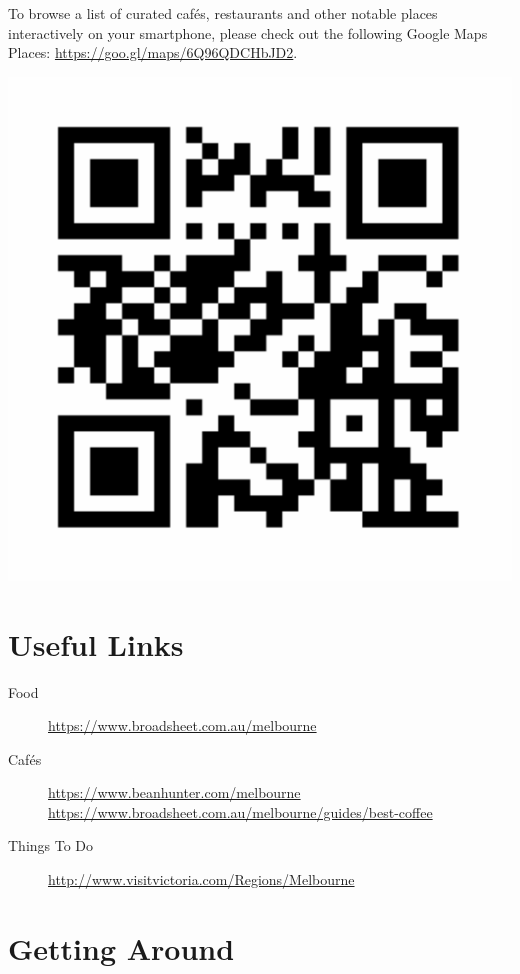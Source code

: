 To browse a list of curated caf{\'e}s, restaurants and other notable places interactively on your smartphone, please check out the following Google Maps Places: \url{https://goo.gl/maps/6Q96QDCHbJD2}.
\vspace*{-1.3em}
\begin{center}
\includegraphics[scale=0.2]{content/local-guide/gmaps.pdf}
\end{center}

\section*{Useful Links}
\vspace*{-1em}

\begin{description}
\item[Food] \url{https://www.broadsheet.com.au/melbourne}
\item[Caf{\'e}s] \url{https://www.beanhunter.com/melbourne} \\
\url{https://www.broadsheet.com.au/melbourne/guides/best-coffee}
\item[Things To Do] \url{http://www.visitvictoria.com/Regions/Melbourne}
\end{description}

\section*{Getting Around}

